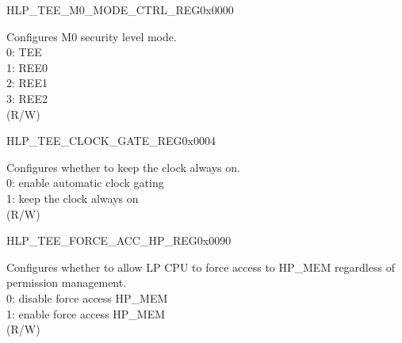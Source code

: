 \begin{register}{H}{LP\_TEE\_M0\_MODE\_CTRL\_REG}{0x0000}\label{regdesc:LPTEEM0MODECTRLREG}
%
%
\regnewline%
\begin{regdesc}\begin{reglist}
\label{fielddesc:LPTEEM0MODE}\item [LP\_TEE\_M0\_MODE] Configures M0 security level mode.\\ 
0: TEE \\
1: REE0 \\
2: REE1 \\
3: REE2  \\
(R/W)
\end{reglist}\end{regdesc}
\end{register}


\begin{register}{H}{LP\_TEE\_CLOCK\_GATE\_REG}{0x0004}\label{regdesc:LPTEECLOCKGATEREG}
%
%
\regnewline%
\begin{regdesc}\begin{reglist}
\label{fielddesc:LPTEECLKEN}\item [LP\_TEE\_CLK\_EN] Configures whether to keep the clock always on.\\ 
0: enable automatic clock gating \\ 
1: keep the clock always on  \\ (R/W)
\end{reglist}\end{regdesc}
\end{register}


\begin{register}{H}{LP\_TEE\_FORCE\_ACC\_HP\_REG}{0x0090}\label{regdesc:LPTEEFORCEACCHPREG}
%
%
\regnewline%
\begin{regdesc}\begin{reglist}
\label{fielddesc:LPTEEFORCEACCHPMEMEN}\item [LP\_TEE\_FORCE\_ACC\_HPMEM\_EN] Configures whether to allow LP CPU to force access to HP\_MEM regardless of permission management.\\ 
0: disable force access HP\_MEM \\ 
1: enable force access HP\_MEM  \\ (R/W)
\end{reglist}\end{regdesc}
\end{register}


